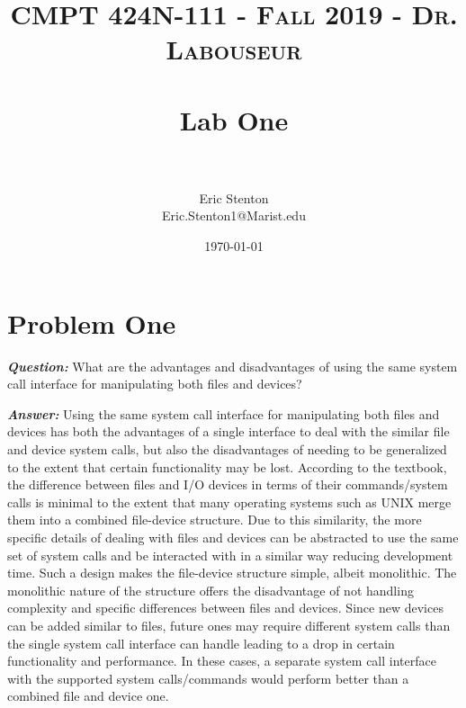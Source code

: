 \documentclass[letterpaper, 10pt,DIV=13]{scrartcl}
\title{	
   \normalfont \normalsize 
   \textsc{CMPT 424N-111 - Fall 2019 - Dr. Labouseur} \\[10pt] %
   \horrule{0.5pt} \\[0.25cm] 	%
   \huge Lab One  \\     	    %
   \horrule{0.5pt} \\[0.25cm] 	%
}
\author{Eric Stenton \\ \normalsize Eric.Stenton1@Marist.edu}
\date{\normalsize\today} 	%
\numberwithin{equation}{section} %
\numberwithin{figure}{section} %
\numberwithin{table}{section} %
\begin{document}
\maketitle %

\section{Problem One}

\textbf{\emph{Question:}}
What are the advantages and disadvantages of using the same system call interface for manipulating both files and devices?

\textbf{\emph{Answer:}}
Using the same system call interface for manipulating both files and devices has both the advantages of a single interface to deal with the similar file and device system calls, but also the disadvantages of needing to be generalized to the extent that certain functionality may be lost. According to the textbook, the difference between files and I/O devices in terms of their commands/system calls is minimal to the extent that many operating systems such as UNIX merge them into a combined file-device structure\cite{concepts}. Due to this similarity, the more specific details of dealing with files and devices can be abstracted to use the same set of system calls and be interacted with in a similar way reducing development time. Such a design makes the file-device structure simple, albeit monolithic. The monolithic nature of the structure offers the disadvantage of not handling complexity and specific differences between files and devices. Since new devices can be added similar to files, future ones may require different system calls than the single system call interface can handle leading to a drop in certain functionality and performance. In these cases, a separate system call interface with the supported system calls/commands would perform better than a combined file and device one.


\pagebreak

\end{document}
